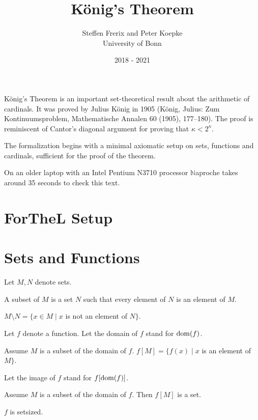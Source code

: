 \documentclass{article}
\title{König's Theorem}
\author{Steffen Frerix and Peter Koepke\\
University of Bonn}
\date{2018 - 2021}
\newcommand{\Naproche}{$\mathbb{N}$aproche}
\begin{document}
  \maketitle

König's Theorem is an important set-theoretical result about the
arithmetic of cardinals. It was proved by Julius König in 1905
(König, Julius: Zum Kontinuumsproblem, Mathematische Annalen 60 (1905), 177–180).
The proof is reminiscent of Cantor's diagonal argument for
proving that $κ < 2^{κ}$.

The formalization begins with a minimal axiomatic setup on sets, functions
and cardinals, sufficient for the proof of the theorem.

On an older laptop
with an Intel Pentium N3710 processor \Naproche{} takes
around 35 seconds to check this text.

\section{ForTheL Setup}

\begin{forthel}
\end{forthel}


\section{Sets and Functions}

\begin{forthel}
    Let $M,N$ denote sets.

    \begin{definition}
     A subset of $M$ is a set $N$ such that every element
     of $N$ is an element of $M$.
    \end{definition}

    \begin{definition}
      $M \setminus N = \{x \in M \mid x$ is not an element of $N\}$.
    \end{definition}

    Let $f$ denote a function.
    Let the domain of $f$ stand for $\operatorname{dom}(f)$.

    \begin{definition}
      Assume $M$ is a subset of the domain of $f$.
      $f[M] = \{f(x) \mid x$ is an element of $M\}$.
    \end{definition}

    Let the image of $f$ stand for $f[\operatorname{dom}(f)]$.

    \begin{axiom}
      Assume $M$ is a subset of the domain of $f$.
      Then $f[M]$ is a set.
    \end{axiom}

    \begin{axiom}
      $f$ is setsized.
    \end{axiom}
\end{forthel}
\end{document}
